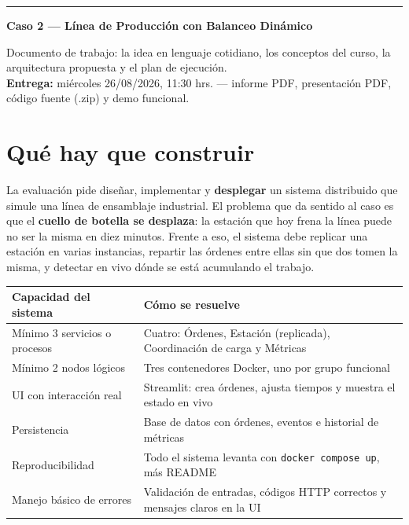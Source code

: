 \documentclass[11pt,a4paper]{article}
\begin{document}
{\color{usachteal}\rule{\textwidth}{1.2pt}}\vspace{-4pt}

{\large\bfseries\color{usachdark} Caso 2 --- Línea de Producción con Balanceo Dinámico}

{\small\color{usachdark!75} Documento de trabajo: la idea en lenguaje cotidiano, los conceptos del curso, la arquitectura propuesta y el plan de ejecución.\\
\textbf{Entrega:} miércoles 26/08/2026, 11:30 hrs. --- informe PDF, presentación PDF, código fuente (.zip) y demo funcional.}

\vspace{-2pt}{\color{usachteal}\rule{\textwidth}{0.6pt}}

\section{Qué hay que construir}

La evaluación pide diseñar, implementar y \textbf{desplegar} un sistema distribuido que simule una línea de ensamblaje industrial. El problema que da sentido al caso es que el \textbf{cuello de botella se desplaza}: la estación que hoy frena la línea puede no ser la misma en diez minutos. Frente a eso, el sistema debe replicar una estación en varias instancias, repartir las órdenes entre ellas sin que dos tomen la misma, y detectar en vivo dónde se está acumulando el trabajo.

\vspace{-3pt}
\begin{table}[H]
\centering\footnotesize
\begin{tabular}{@{}L{5.1cm} L{10.1cm}@{}}
\toprule
\textbf{Capacidad del sistema} & \textbf{Cómo se resuelve} \\
\midrule
Mínimo 3 servicios o procesos & Cuatro: Órdenes, Estación (replicada), Coordinación de carga y Métricas \\
Mínimo 2 nodos lógicos & Tres contenedores Docker, uno por grupo funcional \\
UI con interacción real & Streamlit: crea órdenes, ajusta tiempos y muestra el estado en vivo \\
Persistencia & Base de datos con órdenes, eventos e historial de métricas \\
Reproducibilidad & Todo el sistema levanta con \texttt{docker compose up}, más README \\
Manejo básico de errores & Validación de entradas, códigos HTTP correctos y mensajes claros en la UI \\
\bottomrule
\end{tabular}
\end{table}
\end{document}
